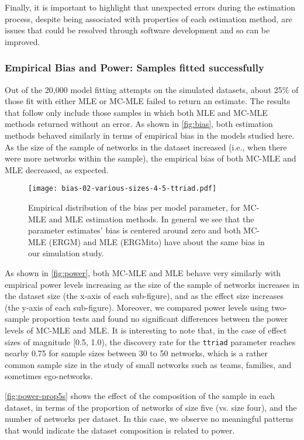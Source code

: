 \documentclass[12pt]{article}
\begin{document}
Finally, it is important to highlight that unexpected errors during the estimation process, despite being associated with properties of each estimation method, are issues that could be resolved through software development and so can be improved.

\pagebreak

\subsubsection{Empirical Bias and Power: Samples fitted successfully}

Out of the 20,000 model fitting attempts on the simulated datasets, about 25\% of those fit with either MLE or MC-MLE failed to return an estimate. The results that follow only include those samples in which both MLE and MC-MLE methods returned without an error. As shown in \autoref{fig:bias}, both estimation methods behaved similarly in terms of empirical bias in the models studied here. As the size of the sample of networks in the dataset increased (i.e., when there were more networks within the sample), the empirical bias of both MC-MLE and MLE decreased, as expected.

\begin{figure}
	\centering
	\caption{\label{fig:bias}Empirical distribution of the bias per model parameter, for MC-MLE and MLE estimation methods. In general we see that the parameter estimates' bias is centered around zero and both MC-MLE (ERGM) and MLE (ERGMito) have about the same bias in our simulation study.}
	\texttt{[image: bias-02-various-sizes-4-5-ttriad.pdf]}
\end{figure}

As shown in \autoref{fig:power}, both MC-MLE and MLE behave very similarly with empirical power levels increasing as the size of the sample of networks increases in the dataset size (the x-axis of each sub-figure), and as the effect size increases (the y-axis of each sub-figure). Moreover, we compared power levels using two-sample proportion tests and found no significant differences between the power levels of MC-MLE and MLE. It is interesting to note that, in the case of effect sizes of magnitude [0.5, 1.0), the discovery rate for the \texttt{ttriad} parameter reaches nearby 0.75 for sample sizes between 30 to 50 networks, which is a rather common sample size in the study of small networks such as teams, families, and sometimes ego-networks. 

\autoref{fig:power-prop5s} shows the effect of the composition of the sample in each dataset, in terms of the proportion of networks of size five (vs. size four), and the number of networks per dataset. In this case, we observe no meaningful patterns that would indicate the dataset composition is related to power.
\end{document}
